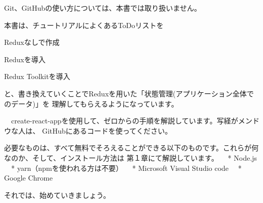 Git、GitHubの使い方については、本書では取り扱いません。

本書は、チュートリアルによくあるToDoリストを\\[0pt]

\begin{starterenumerate}
\item Reduxなしで作成
\item Reduxを導入
\item Redux Toolkitを導入
\end{starterenumerate}

と、書き換えていくことでReduxを用いた「状態管理(アプリケーション全体でのデータ)」を
理解してもらえるようになっています。

　create{-}react{-}appを使用して、ゼロからの手順を解説しています。写経がメンドウな人は、
GitHubにあるコードを使ってください。

必要なものは、すべて無料でそろえることができる以下のものです。これらが何なのか、そして、インストール方法は
第１章にて解説しています。
　* Node.js
　* yarn（npmを使われる方は不要）
　* Microsoft Visual Studio code
　* Google Chrome

それでは、始めていきましょう。
